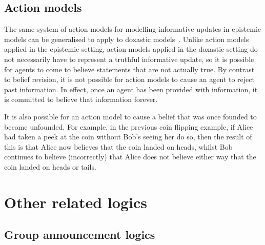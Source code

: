 \subsection{Action models}

The same system of action models for modelling informative updates in epistemic
models can be generalised to apply to doxastic
models~\cite{vanditmarsch2007dynamic}. Unlike action models applied in the
epistemic setting, action models applied in the doxastic setting do not
necessarily have to represent a truthful informative update, so it is possible
for agents to come to believe statements that are not actually true. By contrast
to belief revision, it is not possible for action models to cause an agent to
reject past information. In effect, once an agent has been provided with
information, it is committed to believe that information forever. 

It is also possible for an action model to cause a belief that was once founded
to become unfounded. For example, in the previous coin flipping example, if
Alice had taken a peek at the coin without Bob's seeing her do so, then the
result of this is that Alice now believes that the coin landed on heads, whilst
Bob continues to believe (incorrectly) that Alice does not believe either way
that the coin landed on heads or tails.

\section{Other related logics}

\subsection{Group announcement logics}

